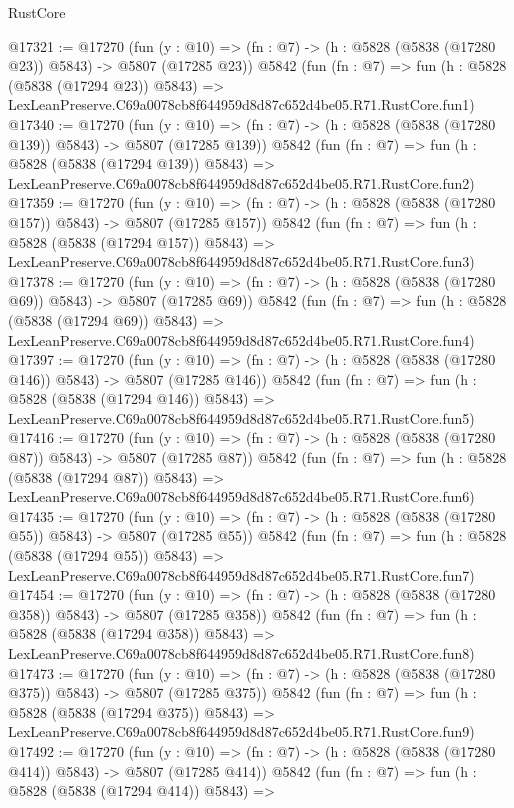 \begin{lexlean}{RustCore}
\begin{coremodule}
@17321 := @17270
    (fun (y : @10) => (fn : @7) -> (h : @5828 (@5838 (@17280 @23)) @5843) -> @5807 (@17285 @23))
    @5842
    (fun (fn : @7) =>
    fun (h : @5828 (@5838 (@17294 @23)) @5843) =>
    LexLeanPreserve.C69a0078cb8f644959d8d87c652d4be05.R71.RustCore.fun1)
@17340 := @17270
    (fun (y : @10) => (fn : @7) -> (h : @5828 (@5838 (@17280 @139)) @5843) -> @5807 (@17285 @139))
    @5842
    (fun (fn : @7) =>
    fun (h : @5828 (@5838 (@17294 @139)) @5843) =>
    LexLeanPreserve.C69a0078cb8f644959d8d87c652d4be05.R71.RustCore.fun2)
@17359 := @17270
    (fun (y : @10) => (fn : @7) -> (h : @5828 (@5838 (@17280 @157)) @5843) -> @5807 (@17285 @157))
    @5842
    (fun (fn : @7) =>
    fun (h : @5828 (@5838 (@17294 @157)) @5843) =>
    LexLeanPreserve.C69a0078cb8f644959d8d87c652d4be05.R71.RustCore.fun3)
@17378 := @17270
    (fun (y : @10) => (fn : @7) -> (h : @5828 (@5838 (@17280 @69)) @5843) -> @5807 (@17285 @69))
    @5842
    (fun (fn : @7) =>
    fun (h : @5828 (@5838 (@17294 @69)) @5843) =>
    LexLeanPreserve.C69a0078cb8f644959d8d87c652d4be05.R71.RustCore.fun4)
@17397 := @17270
    (fun (y : @10) => (fn : @7) -> (h : @5828 (@5838 (@17280 @146)) @5843) -> @5807 (@17285 @146))
    @5842
    (fun (fn : @7) =>
    fun (h : @5828 (@5838 (@17294 @146)) @5843) =>
    LexLeanPreserve.C69a0078cb8f644959d8d87c652d4be05.R71.RustCore.fun5)
@17416 := @17270
    (fun (y : @10) => (fn : @7) -> (h : @5828 (@5838 (@17280 @87)) @5843) -> @5807 (@17285 @87))
    @5842
    (fun (fn : @7) =>
    fun (h : @5828 (@5838 (@17294 @87)) @5843) =>
    LexLeanPreserve.C69a0078cb8f644959d8d87c652d4be05.R71.RustCore.fun6)
@17435 := @17270
    (fun (y : @10) => (fn : @7) -> (h : @5828 (@5838 (@17280 @55)) @5843) -> @5807 (@17285 @55))
    @5842
    (fun (fn : @7) =>
    fun (h : @5828 (@5838 (@17294 @55)) @5843) =>
    LexLeanPreserve.C69a0078cb8f644959d8d87c652d4be05.R71.RustCore.fun7)
@17454 := @17270
    (fun (y : @10) => (fn : @7) -> (h : @5828 (@5838 (@17280 @358)) @5843) -> @5807 (@17285 @358))
    @5842
    (fun (fn : @7) =>
    fun (h : @5828 (@5838 (@17294 @358)) @5843) =>
    LexLeanPreserve.C69a0078cb8f644959d8d87c652d4be05.R71.RustCore.fun8)
@17473 := @17270
    (fun (y : @10) => (fn : @7) -> (h : @5828 (@5838 (@17280 @375)) @5843) -> @5807 (@17285 @375))
    @5842
    (fun (fn : @7) =>
    fun (h : @5828 (@5838 (@17294 @375)) @5843) =>
    LexLeanPreserve.C69a0078cb8f644959d8d87c652d4be05.R71.RustCore.fun9)
@17492 := @17270
    (fun (y : @10) => (fn : @7) -> (h : @5828 (@5838 (@17280 @414)) @5843) -> @5807 (@17285 @414))
    @5842
    (fun (fn : @7) =>
    fun (h : @5828 (@5838 (@17294 @414)) @5843) =>

\end{coremodule}
\end{lexlean}
